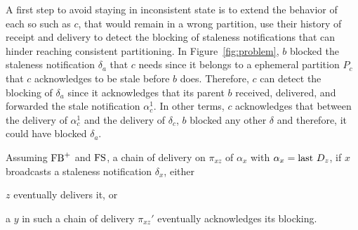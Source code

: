 A first step to avoid staying in inconsistent state is to extend the
behavior of each \process so \processes such as $c$, that would remain
in a wrong partition, use their history of receipt and delivery to
detect the blocking of staleness notifications that can hinder
reaching consistent partitioning.  In Figure~\ref{fig:problem}, $b$
blocked the staleness notification $\delta_a$ that $c$ needs since it
belongs to a ephemeral partition $P_c$ that $c$ acknowledges to be
stale before $b$ does. Therefore, $c$ can detect the blocking of
$\delta_a$ since it acknowledges that its parent $b$ received,
delivered, and forwarded the stale notification $\alpha_c^1$. In other
terms, $c$ acknowledges that between the delivery of $\alpha_c^1$ and
the delivery of $\delta_c$, $b$ blocked any other $\delta$ and
therefore, it could have blocked $\delta_a$.



\begin{lemma} Assuming
  $\textup{FB}^+$ and $\textup{FS}$, a chain of delivery on $\pi_{xz}$ of
  $\alpha_x$ with $\alpha_x = \textup{last}~ D_z$, if $x$ broadcasts a staleness
  notification $\delta_x$, either
  \begin{inparaenum}[(A)]
  \item\label{lem:detectorA}  $z$ eventually delivers it, or 
  \item\label{lem:detectorB} a \process $y$ in such a chain of
    delivery $\pi_{xz}'$ eventually acknowledges its blocking.
  \end{inparaenum}
\end{lemma}


